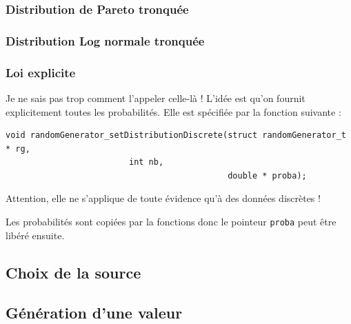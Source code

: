 %
\subsubsection{Distribution de Pareto tronquée}


%
\subsubsection{Distribution Log normale tronquée}


%
\subsubsection{Loi  explicite}

   Je ne sais pas trop comment l'appeler celle-là ! L'idée est qu'on
fournit explicitement toutes les probabilités. Elle est spécifiée par
la fonction suivante :

\begin{verbatim}
void randomGenerator_setDistributionDiscrete(struct randomGenerator_t * rg,
					     int nb,
                                             double * proba);
\end{verbatim}

   Attention, elle ne s'applique de toute évidence qu'à des données
discrètes !

   Les probabilités sont copiées par la fonctions donc le pointeur
{\tt proba} peut être libéré ensuite.

%
\subsection{Choix de la source}

%
\subsection{Génération d'une valeur}

